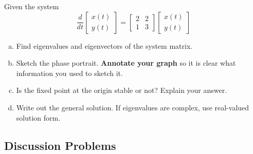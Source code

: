 \newpage\begin{question}
Given the system
  \[
    \frac{d}{dt}
    \begin{bmatrix}
      x(t) \\ y(t)
    \end{bmatrix} =
    \begin{bmatrix}
      2 & 2 \\ 1 & 3
    \end{bmatrix}
    \begin{bmatrix}
      x(t) \\ y(t)
    \end{bmatrix}
  \]
  \begin{enumerate}[(a)]
  \item Find eigenvalues and eigenvectors of the system matrix. 
\solspace{3.5in}
\item Sketch the phase portrait. \textbf{Annotate your graph} so it is clear what information you used to sketch it.
  \begin{center}
\end{center}
  \item Is the fixed point at the origin stable or not? Explain your answer.
    \solspace{0.5in}
  \item Write out the general solution. If eigenvalues are complex, use real-valued solution form.
    \solspace{0.5in}

\end{enumerate}
\end{question}


\subsection*{Discussion Problems}


